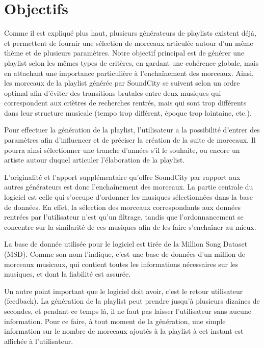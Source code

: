 
\section{Objectifs}
Comme il est expliqué plus haut, plusieurs générateurs de playlists existent
déjà, et permettent de fournir une sélection de morceaux articulée autour 
d'un même thème et de plusieurs paramètres.
Notre objectif principal est de générer une playlist selon les mêmes types 
de critères, en gardant une cohérence globale, mais en attachant une 
importance particulière à l'enchaînement des morceaux. Ainsi, les morceaux 
de la playlist générée par SoundCity se suivent selon un ordre optimal afin 
d'éviter des transitions brutales entre deux musiques qui correspondent aux 
criètres de recherches rentrés, mais qui sont trop différents dans leur 
structure musicale (tempo trop différent, époque trop lointaine, etc.).

Pour effectuer la génération de la playlist, l'utilisateur a la possibilité 
d'entrer des paramètres afin d'influencer et de préciser la création de la 
suite de morceaux. Il pourra ainsi sélectionner une tranche d'années s'il le 
souhaite, ou encore un artiste autour duquel articuler l'élaboration de la 
playlist.

L'originalité et l'apport supplémentaire qu'offre SoundCity par rapport aux 
autres générateurs est donc l'enchaînement des morceaux. La partie centrale 
du logiciel est celle qui s'occupe d'ordonner les musiques sélectionnées 
dans la base de données. En effet, la sélection des morceaux correspondants 
aux données rentrées par l'utilisateur n'est qu'un filtrage, tandis que 
l'ordonnancement se concentre sur la similarité de ces musiques afin de les 
faire s'enchaîner au mieux.

La base de donnée utilisée pour le logiciel est tirée de la Million Song 
Dataset (MSD). Comme son nom l'indique, c'est une base de données d'un 
million de morceaux musicaux, qui contient toutes les informations 
nécessaires sur les musiques, et dont la fiabilité est assurée.

Un autre point important que le logiciel doit avoir, c'est le retour 
utilisateur (feedback). La génération de la playlist peut prendre jusqu'à 
plusieurs dizaines de secondes, et pendant ce temps là, il ne faut pas 
laisser l'utilisateur sans aucune information. Pour ce faire, à tout moment 
de la génération, une simple information sur le nombre de morceaux ajoutés à 
la playlist à cet instant est affichée à l'utilisateur.